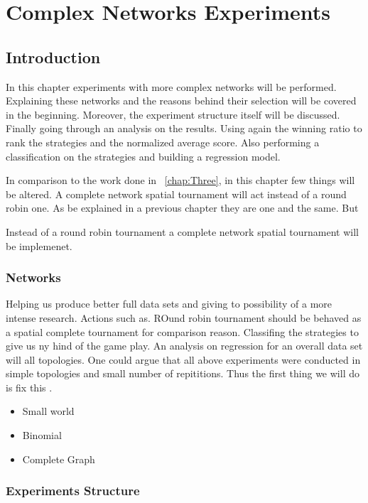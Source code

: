 \chapter{Complex Networks Experiments}
\label{chap:Four}

\section{Introduction}
In this chapter experiments with more complex networks will be performed.
Explaining these networks and the reasons behind their selection will be covered
in the beginning. Moreover, the experiment structure itself will be discussed.
Finally going through an analysis on the results. Using again the winning
ratio to rank the strategies and the normalized average score. Also performing
a classification on the strategies and building a regression model.

In comparison to the work done in ~\ref{chap:Three}, in this chapter few things will
be altered. A complete network spatial tournament will act instead of a round
robin one. As be explained in a previous chapter they are one and the same. But



Instead of a round robin tournament a complete network spatial
tournament will be implemenet.

\subsection{Networks}

Helping us produce better full data sets and giving to possibility of a
more intense research. Actions such as. ROund robin tournament should be
behaved as a spatial complete tournament for comparison reason. Classifing the
strategies to give us ny hind of the game play. An analysis on regression
for an overall data set will all topologies. One could argue that all above experiments
were conducted in simple topologies and small number of repititions. Thus the first thing we will
do is fix this .

\begin{itemize}
  \item Small world
  \item Binomial
  \item Complete Graph
\end{itemize}

\subsection{Experiments Structure}


